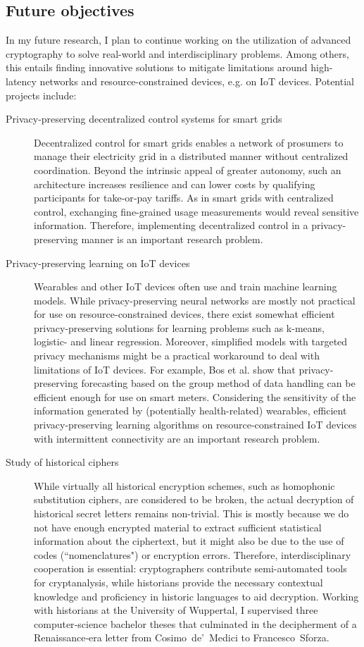 \documentclass{article}
\begin{document}
 \subsection*{Future objectives}
In my future research, I plan to continue working on the utilization of advanced cryptography to solve real-world and interdisciplinary problems. Among others, this entails finding innovative solutions to mitigate limitations around high-latency networks and resource-constrained devices, e.g. on IoT devices. Potential projects include:
\begin{description}
    \item[Privacy-preserving decentralized control systems for smart grids] Decentralized control for smart grids \cite{KILTHAU2025124606} enables a network of prosumers to manage their electricity grid in a distributed manner without centralized coordination. Beyond the intrinsic appeal of greater autonomy, such an architecture increases resilience and can lower costs by qualifying participants for take‑or‑pay tariffs. As in smart grids with centralized control, exchanging fine-grained usage measurements would reveal sensitive information. Therefore, implementing decentralized control in a privacy-preserving manner is an important research problem.
    \item[Privacy-preserving learning on IoT devices] Wearables and other IoT devices often use and train machine learning models. While privacy-preserving neural networks are mostly not practical for use on resource-constrained devices, there exist somewhat efficient privacy-preserving solutions for learning problems such as k-means, logistic- and linear regression. Moreover, simplified models with targeted privacy mechanisms might be a practical workaround to deal with limitations of IoT devices. For example, Bos et al. \cite{BosCIV17} show that privacy-preserving forecasting based on the group method of data handling can be efficient enough for use on smart meters. Considering the sensitivity of the information generated by (potentially health-related) wearables, efficient privacy-preserving learning algorithms on resource-constrained IoT devices with intermittent connectivity are an important research problem.
    \item[Study of historical ciphers] While virtually all historical encryption schemes, such as homophonic substitution ciphers, are considered to be broken, the actual decryption of historical secret letters remains non-trivial. This is mostly because we do not have enough encrypted material to extract sufficient statistical information about the ciphertext, but it might also be due to the use of codes (``nomenclatures") or encryption errors. Therefore, interdisciplinary cooperation is essential: cryptographers contribute semi-automated tools for cryptanalysis, while historians provide the necessary contextual knowledge and proficiency  in historic languages to aid decryption. Working with historians at the University of Wuppertal, I supervised three computer‑science bachelor theses that culminated in the decipherment of a Renaissance‑era letter from Cosimo~de'~Medici to Francesco~Sforza.

\end{description}
\end{document}
